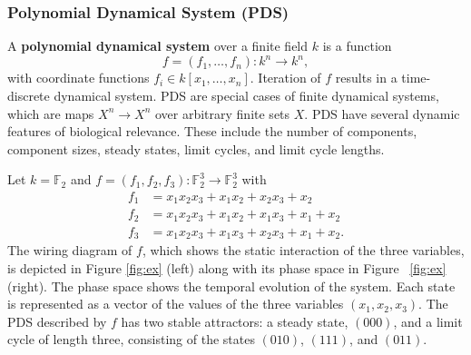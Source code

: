 \documentclass[11pt]{amsart}
\newenvironment{example}[1][Example]{\begin{trivlist}
\item[\hskip \labelsep {\bfseries #1}]}{\end{trivlist}}
\begin{document}
\subsubsection{Polynomial Dynamical System (PDS)}\label{pds}
A {\bf polynomial dynamical system} \cite{JLSS} over a finite field $k$ is a function
$$f = (f_1, \ldots, f_n) : k^n \rightarrow k^n,$$
with coordinate functions $f_i \in k[x_1, \ldots , x_n]$. Iteration of $f$ results
in a time-discrete dynamical system. PDS are special cases of finite
dynamical systems, which are maps $X^n \rightarrow   X^n$ over arbitrary
finite sets $X$.
PDS have several dynamic features of biological
relevance. These include the number of components, component sizes, steady states, limit cycles, and limit cycle lengths.
\begin{example}
Let $k= \mathbb F_2$ and $f = (f_1, f_2, f_3) : \mathbb F_2^3 \rightarrow
\mathbb F_2^3$ with
\begin{align*}
f_1 &= x_1x_2x_3+x_1x_2+x_2x_3+x_2 \\
f_2 &= x_1x_2x_3+x_1x_2+x_1x_3+x_1+x_2 \\
f_3 &= x_1x_2x_3+x_1x_3+x_2x_3+x_1+x_2.
\end{align*}
The wiring diagram of $f$, which shows the static interaction of the three
variables, is
depicted in Figure \ref{fig:ex} (left) along with its phase space in Figure
~\ref{fig:ex} (right).
The phase space shows the temporal evolution of the system. Each state is
represented as a vector of the values of the three variables $(x_1, x_2,
x_3)$.
The PDS described by $f$ has
two stable attractors: a  steady state, $(000)$, and a limit cycle of length
three, consisting of the states $(010)$, $(111)$, and $(011)$.
\end{example}
\end{document}
